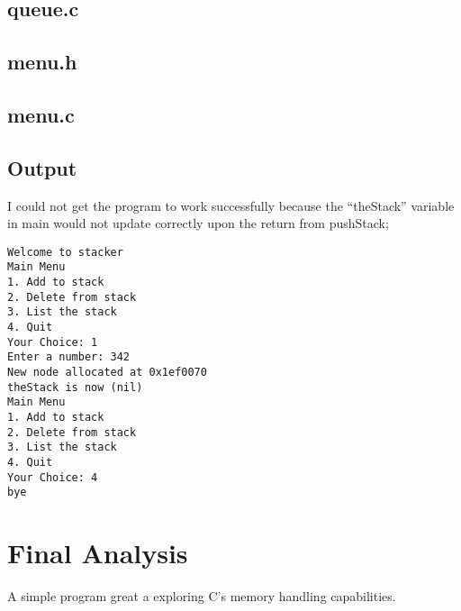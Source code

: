 \documentclass[letterpaper,oneside]{scrartcl}
\begin{document}
\subsection{queue.c}

\subsection{menu.h}

\subsection{menu.c}

\subsection{Output}
I could not get the program to work successfully because the ``theStack'' variable in main
would not update correctly upon the return from pushStack;

\begin{Verbatim}
Welcome to stacker
Main Menu
1. Add to stack
2. Delete from stack
3. List the stack
4. Quit
Your Choice: 1
Enter a number: 342
New node allocated at 0x1ef0070
theStack is now (nil)
Main Menu
1. Add to stack
2. Delete from stack
3. List the stack
4. Quit
Your Choice: 4
bye
\end{Verbatim}

\section{Final Analysis}

A simple program great a exploring C's memory handling capabilities.
\end{document}
